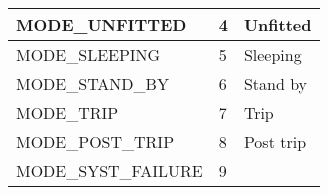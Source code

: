 \documentclass{template/openetcs_article}
\begin{document}
\begin{longtable}{|l|l|l|}
		\begin{minipage}[t]{0.45\linewidth} MODE\_UNFITTED \end{minipage}
	&	\begin{minipage}[t]{0.15\linewidth} 4	\end{minipage} 
	&	\begin{minipage}[t]{0.45\linewidth} Unfitted \end{minipage} \\
	\hline
		\begin{minipage}[t]{0.45\linewidth} MODE\_SLEEPING \end{minipage}
	&	\begin{minipage}[t]{0.15\linewidth} 5	\end{minipage} 
	&	\begin{minipage}[t]{0.45\linewidth} Sleeping \end{minipage} \\
	\hline
		\begin{minipage}[t]{0.45\linewidth} MODE\_STAND\_BY \end{minipage}
	&	\begin{minipage}[t]{0.15\linewidth} 6	\end{minipage} 
	&	\begin{minipage}[t]{0.45\linewidth} Stand by \end{minipage} \\
	\hline
		\begin{minipage}[t]{0.45\linewidth} MODE\_TRIP\end{minipage}
	&	\begin{minipage}[t]{0.15\linewidth} 7\end{minipage} 
	&	\begin{minipage}[t]{0.45\linewidth} Trip\end{minipage} \\
	\hline
		\begin{minipage}[t]{0.45\linewidth} MODE\_POST\_TRIP	\end{minipage}
	&	\begin{minipage}[t]{0.15\linewidth} 8	\end{minipage} 
	&	\begin{minipage}[t]{0.45\linewidth} Post trip	\end{minipage} \\
	\hline
		\begin{minipage}[t]{0.45\linewidth} MODE\_SYST\_FAILURE	\end{minipage}
	&	\begin{minipage}[t]{0.15\linewidth} 9	\end{minipage} 

\end{longtable}
\end{document}
